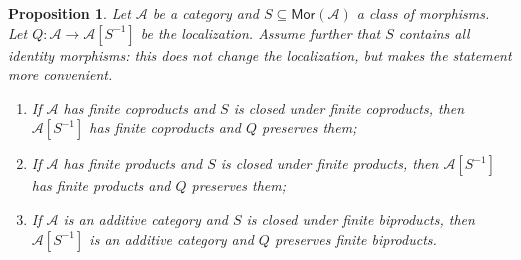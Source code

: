 \documentclass[10pt,a4paper]{amsart}
\theoremstyle{plain}
\newtheorem{proposition}[theorem]{Proposition}
\theoremstyle{definition}
\theoremstyle{remark}
\begin{document}
\begin{proposition}\label{prop:finite-structure-localization}
  Let $\mathcal{A}$ be a category and $S \subseteq \mathsf{Mor}(\mathcal{A})$ a class of morphisms.
  Let $Q:\mathcal A\longrightarrow \mathcal A[S^{-1}]$ be the localization.
  Assume further that $S$ contains all identity morphisms: this does not change the localization, but makes the statement more convenient.
  \begin{enumerate}[label=\textup{(\arabic*)}]
    \item If $\mathcal{A}$ has finite coproducts and $S$ is closed under finite coproducts, then $\mathcal{A}[S^{-1}]$ has finite coproducts and $Q$ preserves them;
    \item If $\mathcal{A}$ has finite products and $S$ is closed under finite products, then $\mathcal{A}[S^{-1}]$ has finite products and $Q$ preserves them;
    \item If $\mathcal{A}$ is an additive category and $S$ is closed under finite biproducts, then $\mathcal{A}[S^{-1}]$ is an additive category and $Q$ preserves finite biproducts.
  \end{enumerate}
\end{proposition}
\end{document}
